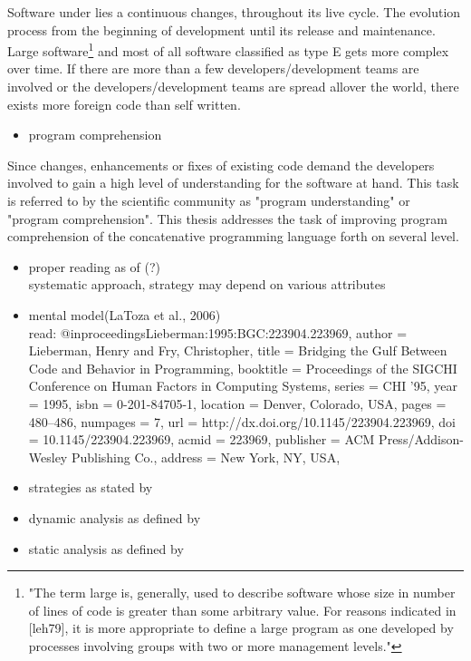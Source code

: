 Software under lies a continuous changes, throughout its live cycle.
The evolution process from the beginning of development until its release and maintenance. Large software\footnote{"The term large is, generally, used to describe software whose size in number of lines of code is greater than some arbitrary value. For reasons indicated in [leh79], it is more appropriate to define a large program as one developed by processes involving groups with two or more management levels."\cite{Lehman:2003:SEB:950401.950407}} and most of all software  classified as type E \cite{Cook:2006:ESS:1115566.1115567} gets more complex over time. If there are more than a few developers/development teams are involved or the developers/development teams are spread allover the world, there exists more foreign code than self written. 

\begin{itemize}
\item program comprehension
\end{itemize}

Since changes, enhancements or fixes of existing code demand the developers involved to gain a high level of understanding for the software at hand. This task is referred to by the scientific community as "program understanding" or "program comprehension". This thesis addresses the task of improving program comprehension of the concatenative programming language forth on several level.

\begin{itemize}
\item proper reading as of \cite{Basili:1997:EPR:257260.257262}(?) \cite{Robillard:2004:EDI:1042203.1042417} \\ systematic approach, strategy may depend on various attributes

\item mental model(LaToza et al., 2006)\\ read: 
@inproceedings{Lieberman:1995:BGC:223904.223969,
author = {Lieberman, Henry and Fry, Christopher},
title = {Bridging the Gulf Between Code and Behavior in Programming},
booktitle = {Proceedings of the SIGCHI Conference on Human Factors in Computing Systems},
series = {CHI '95},
year = {1995},
isbn = {0-201-84705-1},
location = {Denver, Colorado, USA},
pages = {480--486},
numpages = {7},
url = {http://dx.doi.org/10.1145/223904.223969},
doi = {10.1145/223904.223969},
acmid = {223969},
publisher = {ACM Press/Addison-Wesley Publishing Co.},
address = {New York, NY, USA},
}

\item strategies as stated by \cite{Storey:1999:CDE:308936.308940}

\item dynamic analysis as defined by \cite{Ball:1999:CDA:318774.318944} \cite{Cornelissen:2009:SSP:1638616.1639301}

\item static analysis as defined by \cite{Ball:1999:CDA:318774.318944}
\end{itemize}


